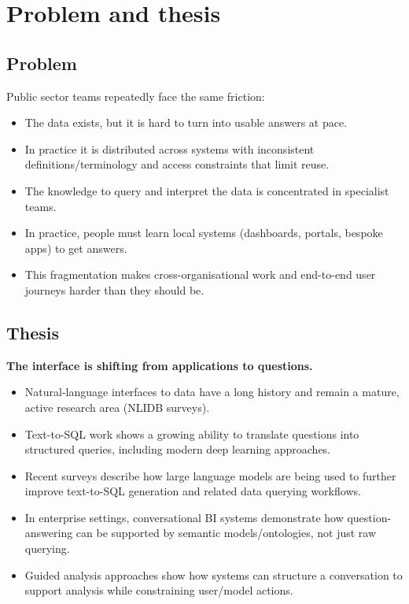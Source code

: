 \section{Problem and thesis}

\subsection{Problem}
Public sector teams repeatedly face the same friction:
\begin{itemize}[leftmargin=*]
  \item The data exists, but it is hard to turn into usable answers at pace.\cite{oecd_data_driven_public_sector2019}
  \item In practice it is distributed across systems with inconsistent definitions/terminology and access constraints that limit reuse.\cite{nao_data_across_gov}
  \item The knowledge to query and interpret the data is concentrated in specialist teams.\cite{nao_data_across_gov}
  \item In practice, people must learn local systems (dashboards, portals, bespoke apps) to get answers.\cite{kingsfund_interop_report}
  \item This fragmentation makes cross-organisational work and end-to-end user journeys harder than they should be.\cite{nhs_england_interop}
\end{itemize}

\subsection{Thesis}
\textbf{The interface is shifting from applications to questions.}
\begin{itemize}[leftmargin=*]
  \item Natural-language interfaces to data have a long history and remain a mature, active research area (NLIDB surveys). \cite{affolter_nlidb_survey2019}
  \item Text-to-SQL work shows a growing ability to translate questions into structured queries, including modern deep learning approaches. \cite{katsogiannismeimarakis_text2sql_survey2023}
  \item Recent surveys describe how large language models are being used to further improve text-to-SQL generation and related data querying workflows. \cite{zhu_llm_text2sql_survey2024}
  \item In enterprise settings, conversational BI systems demonstrate how question-answering can be supported by semantic models/ontologies, not just raw querying. \cite{quamar_conversational_bi2020}
  \item Guided analysis approaches show how systems can structure a conversation to support analysis while constraining user/model actions. \cite{meduri_birec2021}
\end{itemize}

